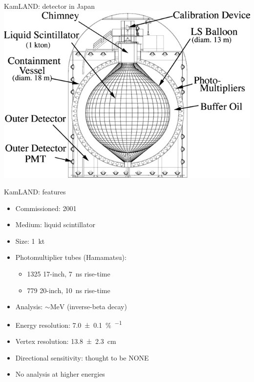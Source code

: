 \documentclass[14pt]{beamer}
\begin{document}
\begin{frame}{KamLAND: \Pnu detector in Japan}
	\centering
	\includegraphics[width=\linewidth]{kamland_schematic.png}
\end{frame}

\begin{frame}[t]{KamLAND: features}
	\begin{itemize}
		\item<1-> Commissioned: \num{2001}
		\item<1-> Medium: liquid scintillator
		\item<1-> Size: \SI{1}{\kilo\tonne}
		\item<1-> Photomultiplier tubes (Hamamatsu):\\
			\begin{itemize}
				\item \num{1325} 17-inch, \SI{7}{\nano\second} rise-time
				\item \num{779} 20-inch, \SI{10}{\nano\second} rise-time
			\end{itemize}
		\item<1-> Analysis: $\sim\!\si{\mega\electronvolt}$ \APnue
			(inverse-beta decay)
		\item<1-> Energy resolution:
			\SI{7.0\pm0.1}{\percent\per{}}
		\item<1-> Vertex resolution:
			\SI{13.8\pm2.3}{\centi\meter}
		\item<2-> {\color{red}Directional sensitivity: thought to be NONE}
		\item<3-> {\color{red}No analysis at higher energies}
	\end{itemize}
\end{frame}
\end{document}
